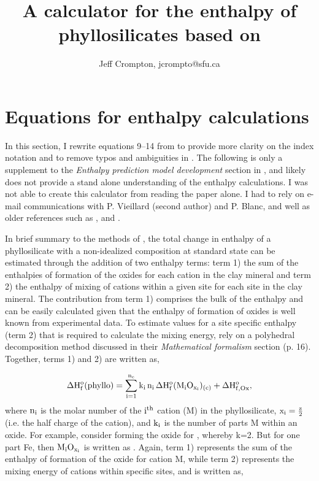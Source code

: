 \documentclass[12pt]{article} %
\numberwithin{equation}{section}
\numberwithin{table}{section}
\numberwithin{figure}{section}
\begin{document}
%
%
%

\title{A calculator for the enthalpy of phyllosilicates based on \cite{Blanc2015}}
\author{Jeff Crompton, jcrompto@sfu.ca}
\maketitle
\newpage

\section{Equations for enthalpy calculations}

In this section, I rewrite equations 9--14 from \cite{Blanc2015} to provide more clarity on the index notation and to remove typos and ambiguities in \cite{Blanc2015}. The following is only a supplement to the \emph{Enthalpy prediction model development} section in \cite{Blanc2015}, and likely does not provide a stand alone understanding of the enthalpy calculations. I was not able to create this calculator from reading the paper alone. I had to rely on e-mail communications with P. Vieillard (second author) and P. Blanc, and well as older references such as \cite{Chermak1989}, \cite{Vieillard2000} and \cite{Vieillard1994}. 

In brief summary to the methods of \cite{Blanc2015}, the total change in enthalpy of a phyllosilicate with a non-idealized composition at standard state can be estimated through the addition of two enthalpy terms: term 1) the sum of the enthalpies of formation of the oxides for each cation in the clay mineral and term 2) the enthalpy of mixing of cations within a given site for each site in the clay mineral. The contribution from term 1) comprises the bulk of the enthalpy and can be easily calculated given that the enthalpy of formation of oxides is well known from experimental data. To estimate values for a site specific enthalpy (term 2) that is required to calculate the mixing energy, \cite{Blanc2015} rely on a polyhedral decomposition method discussed in their \emph{Mathematical formalism} section (p. 16). Together, terms 1) and 2) are written as,

\begin{equation}
\rm \Delta H_f^o(phyllo)
 = \sum_{i=1}^{n_c} k_i\,n_i\,\Delta H_f^o(M_iO_{x_i})_{(c)}+\Delta H_{f,Ox}^o,
\label{eq1}
\end{equation}
where $\rm n_i$ is the molar number of the $\rm i^{th}$ cation (M) in the phyllosilicate, $\rm x_i = \frac{z}{2}$ (i.e. the half charge of the cation), and $\rm k_i$ is the number of parts M within an oxide. For example, consider  forming the oxide for , whereby k=2. But for one part Fe, then $\rm M_iO_{x_i}$ is written  as . Again, term 1) represents the sum of the enthalpy of formation of the oxide for cation M, while term 2) represents the mixing energy of cations within specific sites, and is written as,
\end{document}
